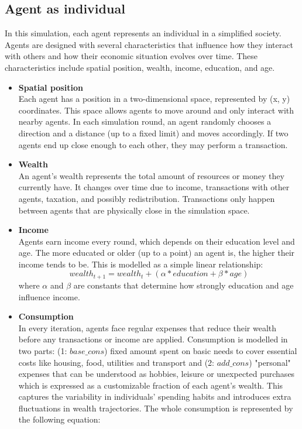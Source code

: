 \documentclass[english]{projectreport}
\begin{document}
\subsection{Agent as individual}
\label{sec:agent-as-individual}

In this simulation, each agent represents an individual in a simplified society. Agents are designed with several characteristics that influence how they interact with others and how their economic situation evolves over time. These characteristics include spatial position, wealth, income, education, and age.

\begin{itemize}

    \item \textbf{Spatial position} \\
        Each agent has a position in a two-dimensional space, represented by (x, y) coordinates. This space allows agents to move around and only interact with nearby agents. In each simulation round, an agent randomly chooses a direction and a distance (up to a fixed limit) and moves accordingly. If two agents end up close enough to each other, they may perform a transaction.
        
    \item \textbf{Wealth} \\
        An agent’s wealth represents the total amount of resources or money they currently have. It changes over time due to income, transactions with other agents, taxation, and possibly redistribution. Transactions only happen between agents that are physically close in the simulation space.
        
    \item \textbf{Income} \\
        Agents earn income every round, which depends on their education level and age. The more educated or older (up to a point) an agent is, the higher their income tends to be. This is modelled as a simple linear relationship:
        \begin{equation}
             wealth_{t + 1} = wealth_{t} + (\alpha * education + \beta * age)
        \end{equation}
        where $\alpha$ and $\beta$ are constants that determine how strongly education and age influence income.

    \item \textbf{Consumption} \\
        In every iteration, agents face regular expenses that reduce their wealth before any transactions or income are applied. Consumption is modelled in two parts: (1: $base\_cons$) fixed amount spent on basic needs to cover essential costs like housing, food, utilities and transport and (2: $add\_cons$) "personal" expenses that can be understood as hobbies, leisure or unexpected purchases which is expressed as a customizable fraction of each agent's wealth. This captures the variability in individuals’ spending habits and introduces extra fluctuations in wealth trajectories. The whole consumption is represented by the following equation:


\end{itemize}
\end{document}
